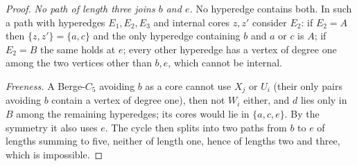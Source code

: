 \documentclass[11pt]{article}
\theoremstyle{remark}
\begin{document}
\begin{proof}
\emph{No path of length three joins $b$ and $e$.} No hyperedge contains
both. In such a path with hyperedges $E_1,E_2,E_3$ and internal cores
$z,z'$ consider $E_2$: if $E_2=A$ then
$\{z,z'\}=\{a,c\}$ and the only hyperedge containing $b$ and $a$ or $c$ is
$A$; if $E_2=B$ the same holds at $e$; every other hyperedge has a vertex
of degree one among the two vertices other than $b,e$, which cannot be
internal.

\emph{Freeness.} A Berge-$C_5$ avoiding $b$ as a core cannot use $X_j$ or
$U_i$ (their only pairs avoiding $b$ contain a vertex of degree one), then
not $W_i$ either, and $d$ lies only in $B$ among the remaining
hyperedges; its cores would lie in $\{a,c,e\}$. By the symmetry it also
uses $e$. The cycle then splits into two paths from $b$ to $e$ of lengths
summing to five, neither of length one, hence of lengths two and three,
which is impossible.


\end{proof}
\end{document}
